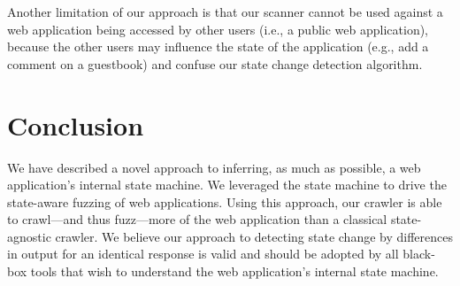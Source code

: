 Another limitation of our approach is that our scanner cannot be used against a
web application being accessed by other users (i.e., a public web application), because
the other users may influence the state of the application (e.g., add a comment
on a guestbook) and confuse our state change detection algorithm. 


\section{Conclusion}

We have described a novel approach to inferring, as much as possible, a web
application's internal state machine. We leveraged the state machine to drive the
state-aware fuzzing of web applications. Using this approach, our crawler is
able to crawl---and thus fuzz---more of the web application than a classical
state-agnostic crawler. We believe our approach to detecting state change by
differences in output for an identical response is valid and should be adopted by
all black-box tools that wish to understand the web application's
internal state machine.



